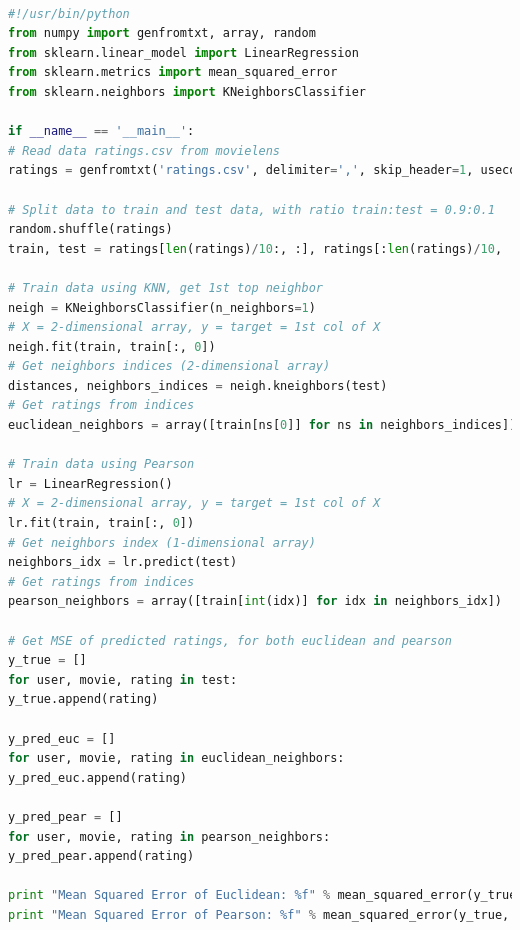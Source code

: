 \documentclass[letterpaper,11pt]{article}
\begin{document}
\begin{lstlisting}[language=python, caption={Code for nearest neighbor–based collaborative filtering algorithm }, label={lst:10_8}]

#!/usr/bin/python
from numpy import genfromtxt, array, random
from sklearn.linear_model import LinearRegression
from sklearn.metrics import mean_squared_error
from sklearn.neighbors import KNeighborsClassifier

if __name__ == '__main__':
# Read data ratings.csv from movielens
ratings = genfromtxt('ratings.csv', delimiter=',', skip_header=1, usecols=range(3))

# Split data to train and test data, with ratio train:test = 0.9:0.1
random.shuffle(ratings)
train, test = ratings[len(ratings)/10:, :], ratings[:len(ratings)/10, :]

# Train data using KNN, get 1st top neighbor
neigh = KNeighborsClassifier(n_neighbors=1)
# X = 2-dimensional array, y = target = 1st col of X
neigh.fit(train, train[:, 0])
# Get neighbors indices (2-dimensional array)
distances, neighbors_indices = neigh.kneighbors(test)
# Get ratings from indices
euclidean_neighbors = array([train[ns[0]] for ns in neighbors_indices])

# Train data using Pearson
lr = LinearRegression()
# X = 2-dimensional array, y = target = 1st col of X
lr.fit(train, train[:, 0])
# Get neighbors index (1-dimensional array)
neighbors_idx = lr.predict(test)
# Get ratings from indices
pearson_neighbors = array([train[int(idx)] for idx in neighbors_idx])

# Get MSE of predicted ratings, for both euclidean and pearson
y_true = []
for user, movie, rating in test:
y_true.append(rating)

y_pred_euc = []
for user, movie, rating in euclidean_neighbors:
y_pred_euc.append(rating)

y_pred_pear = []
for user, movie, rating in pearson_neighbors:
y_pred_pear.append(rating)

print "Mean Squared Error of Euclidean: %f" % mean_squared_error(y_true, y_pred_euc)
print "Mean Squared Error of Pearson: %f" % mean_squared_error(y_true, y_pred_pear)


\end{lstlisting}

\noindent\makebox[\linewidth]{\rule{\textwidth}{0.4pt}}


\medskip


\end{document}
